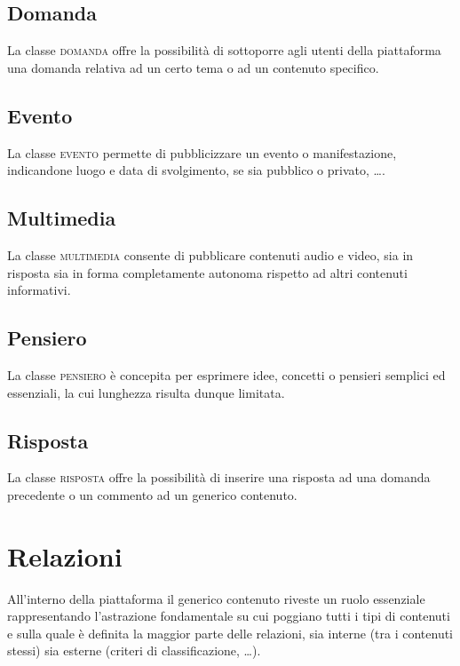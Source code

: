 \documentclass[10pt,a4paper,headinclude,footinclude,hidelinks]{scrreprt} %
\begin{document}
	\subsection{Domanda}
	La classe \textsc{domanda} offre la possibilità di sottoporre agli utenti della piattaforma una domanda relativa ad un certo tema o ad un contenuto specifico.
	\subsection{Evento}
	La classe \textsc{evento} permette di pubblicizzare un evento o manifestazione, indicandone luogo e data di svolgimento, se sia pubblico o privato, \ldots.
	\subsection{Multimedia}
	La classe \textsc{multimedia} consente di pubblicare contenuti audio e video, sia in risposta sia in forma completamente autonoma rispetto ad altri contenuti informativi.
	\subsection{Pensiero}
	La classe \textsc{pensiero} è concepita per esprimere idee, concetti o pensieri semplici ed essenziali, la cui lunghezza risulta dunque limitata.
	\subsection{Risposta}
	La classe \textsc{risposta} offre la possibilità di inserire una risposta ad una domanda precedente o un commento ad un generico contenuto.
	
	\section{Relazioni}
	\label{sec:stage:cls:contenuti:relazioni}
	All'interno della piattaforma il generico contenuto riveste un ruolo essenziale rappresentando l'astrazione fondamentale su cui poggiano tutti i tipi di contenuti e sulla quale è definita la maggior parte delle relazioni, sia interne (tra i contenuti stessi) sia esterne (criteri di classificazione, \ldots).

\end{document}

